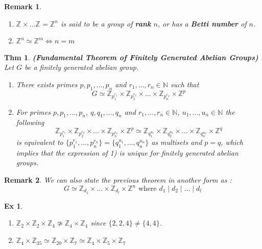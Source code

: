 \documentclass[paper=a4, fontsize=11pt]{scrartcl}
\newcommand{\Zn}[1]{\mathbb{Z}_{#1}}
\newcommand{\nextline}{$ $ \newline \vspace{-0.15in}}
\newtheorem{theorem}{Thm}
\newtheorem{example}{Ex}
\newtheorem*{remark}{Remark}
\begin{document}
\begin{remark}
\nextline
\begin{enumerate}
	\item $\Zn{}\times\dots\Zn{}=\Zn{}^n$ is said to be a group of \textbf{rank} $n$, or has a \textbf{Betti number} of $n$. 
	\item $\Zn{}^n \simeq \Zn{}^m \iff n=m$\\ 
\end{enumerate}
\end{remark}

\begin{theorem}\textbf{(Fundamental Theorem of Finitely Generated Abelian Groups)}\\[0.1in]
	Let $G$ be a finitely generated abelian group.
	\begin{enumerate}[label=\arabic*)]
		\item There exists primes $p,p_1,\dots,p_n$ and $r_1,\dots,r_n \in \mathbb{N}$ such that 
		\begin{equation}\nonumber
			G \simeq \Zn{p_1 ^{r_1}}\times\Zn{p_2 ^{r_2}}\times\dots\times\Zn{p_n ^{r_n}}\times \Zn{}^p
		\end{equation}
		\item For primes $p,p_1,\dots,p_n$, $q,q_1,\dots,q_n$ and $r_1,\dots,r_n \in \mathbb{N}$, $u_1,\dots,u_n \in \mathbb{N}$ the following
		\begin{equation}\nonumber
			\Zn{p_1 ^{r_1}}\times\Zn{p_2 ^{r_2}}\times\dots\times\Zn{p_n ^{r_n}}\times \Zn{}^p \simeq \Zn{q_1 ^{u_1}}\times\Zn{q_2 ^{u_2}}\times\dots\times\Zn{q_n ^{u_n}}\times \Zn{}^q
		\end{equation}
		is equivalent to $\{ p_1^{r_1} ,\dots,p_n^{r_n} \} = \{ q_1^{u_1}, \dots,q_n^{u_n} \}$ as multisets and $p=q$, which implies that the expression of 1) is unique for finitely generated abelian groups.\\
	\end{enumerate}
\end{theorem}

\begin{remark}
	We can also state the previous theorem in another form as :
	\begin{equation}\nonumber
		 G \simeq \Zn{d_1} \times \dots \times \Zn{d_l} \times \Zn{}^n \text{ where } d_1 \mid d_2 \mid \dots \mid d_l
	\end{equation}
\end{remark}

\begin{example}
\nextline
\begin{enumerate}
	\item $\Zn{2}\times\Zn{2}\times\Zn{4} \not\simeq \Zn{4} \times \Zn{4} $ since $\{2,2,4\}\neq\{4,4\}$.
	\item $\Zn{4} \times \Zn{35} \simeq \Zn{20} \times \Zn{7} \simeq \Zn{4} \times \Zn{5} \times \Zn{7}  $\\
\end{enumerate}
\end{example}
\end{document}
